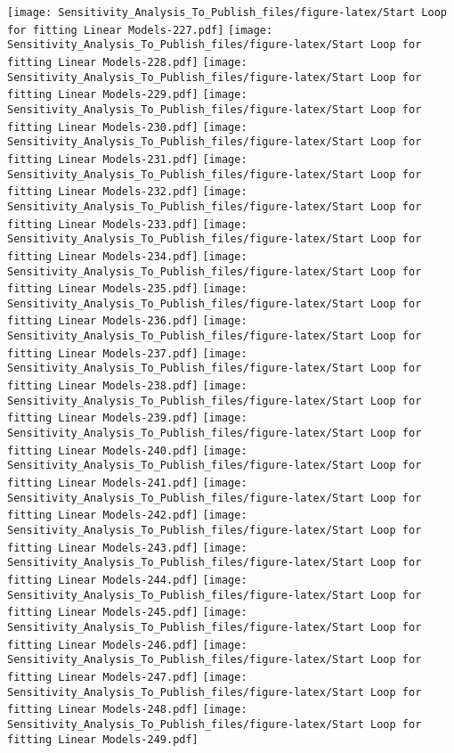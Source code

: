 \documentclass[
]{article}
\begin{document}
\texttt{[image: Sensitivity\_Analysis\_To\_Publish\_files/figure-latex/Start Loop for fitting Linear Models-227.pdf]}
\texttt{[image: Sensitivity\_Analysis\_To\_Publish\_files/figure-latex/Start Loop for fitting Linear Models-228.pdf]}
\texttt{[image: Sensitivity\_Analysis\_To\_Publish\_files/figure-latex/Start Loop for fitting Linear Models-229.pdf]}
\texttt{[image: Sensitivity\_Analysis\_To\_Publish\_files/figure-latex/Start Loop for fitting Linear Models-230.pdf]}
\texttt{[image: Sensitivity\_Analysis\_To\_Publish\_files/figure-latex/Start Loop for fitting Linear Models-231.pdf]}
\texttt{[image: Sensitivity\_Analysis\_To\_Publish\_files/figure-latex/Start Loop for fitting Linear Models-232.pdf]}
\texttt{[image: Sensitivity\_Analysis\_To\_Publish\_files/figure-latex/Start Loop for fitting Linear Models-233.pdf]}
\texttt{[image: Sensitivity\_Analysis\_To\_Publish\_files/figure-latex/Start Loop for fitting Linear Models-234.pdf]}
\texttt{[image: Sensitivity\_Analysis\_To\_Publish\_files/figure-latex/Start Loop for fitting Linear Models-235.pdf]}
\texttt{[image: Sensitivity\_Analysis\_To\_Publish\_files/figure-latex/Start Loop for fitting Linear Models-236.pdf]}
\texttt{[image: Sensitivity\_Analysis\_To\_Publish\_files/figure-latex/Start Loop for fitting Linear Models-237.pdf]}
\texttt{[image: Sensitivity\_Analysis\_To\_Publish\_files/figure-latex/Start Loop for fitting Linear Models-238.pdf]}
\texttt{[image: Sensitivity\_Analysis\_To\_Publish\_files/figure-latex/Start Loop for fitting Linear Models-239.pdf]}
\texttt{[image: Sensitivity\_Analysis\_To\_Publish\_files/figure-latex/Start Loop for fitting Linear Models-240.pdf]}
\texttt{[image: Sensitivity\_Analysis\_To\_Publish\_files/figure-latex/Start Loop for fitting Linear Models-241.pdf]}
\texttt{[image: Sensitivity\_Analysis\_To\_Publish\_files/figure-latex/Start Loop for fitting Linear Models-242.pdf]}
\texttt{[image: Sensitivity\_Analysis\_To\_Publish\_files/figure-latex/Start Loop for fitting Linear Models-243.pdf]}
\texttt{[image: Sensitivity\_Analysis\_To\_Publish\_files/figure-latex/Start Loop for fitting Linear Models-244.pdf]}
\texttt{[image: Sensitivity\_Analysis\_To\_Publish\_files/figure-latex/Start Loop for fitting Linear Models-245.pdf]}
\texttt{[image: Sensitivity\_Analysis\_To\_Publish\_files/figure-latex/Start Loop for fitting Linear Models-246.pdf]}
\texttt{[image: Sensitivity\_Analysis\_To\_Publish\_files/figure-latex/Start Loop for fitting Linear Models-247.pdf]}
\texttt{[image: Sensitivity\_Analysis\_To\_Publish\_files/figure-latex/Start Loop for fitting Linear Models-248.pdf]}
\texttt{[image: Sensitivity\_Analysis\_To\_Publish\_files/figure-latex/Start Loop for fitting Linear Models-249.pdf]}
\end{document}
